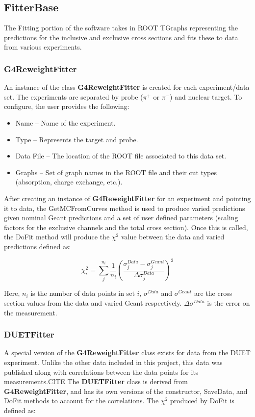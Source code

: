 \documentclass[12pt]{article}
\begin{document}
\subsection{FitterBase}
The Fitting portion of the software takes in ROOT TGraphs representing the predictions for the inclusive and exclusive cross sections and fits these to data from various experiments.

\subsubsection{G4ReweightFitter}
An instance of the class \textbf{G4ReweightFitter} is created for each experiment/data set. The experiments are separated by probe ($\pi^+$ or $\pi^-$) and nuclear target. To configure, the user provides the following:
\begin{itemize}
	\item Name -- Name of the experiment.
	\item Type -- Represents the target and probe.
	\item Data File -- The location of the ROOT file associated to this data set.
	\item Graphs -- Set of graph names in the ROOT file and their cut types (absorption, charge exchange, etc.).
\end{itemize}

After creating an instance of \textbf{G4ReweightFitter} for an experiment and pointing it to data, the GetMCFromCurves method is used to produce varied predictions given nominal  Geant predictions and a set of user defined parameters (scaling factors for the exclusive channels and the total cross section). Once this is called, the DoFit method will produce the $\chi^2$ value between the data and varied predictions defined as: 

\begin{equation}
\chi^2_{i} = \sum\limits_j^{n_i} \frac{1}{n_i}\left(\frac{\sigma_j^{Data} - \sigma_j^{Geant}}{\Delta\sigma_j^{Data}}\right)^2
\end{equation}

Here, $n_i$ is the number of data points in set $i$, $\sigma^{Data}$ and $\sigma^{Geant}$ are the cross section values from the data and varied Geant respectively. $\Delta\sigma^{Data}$ is the error on the measurement. 

\subsubsection{DUETFitter}
A special version of the \textbf{G4ReweightFitter} class exists for data from the DUET experiment. Unlike the other data included in this project, this data was published along with correlations between the data points for its measurements.CITE The \textbf{DUETFitter} class is derived from \textbf{G4ReweightFitter}, and has its own versions of the constructor, SaveData, and DoFit methods to account for the correlations. The $\chi^2$ produced by DoFit is defined as:
\end{document}
